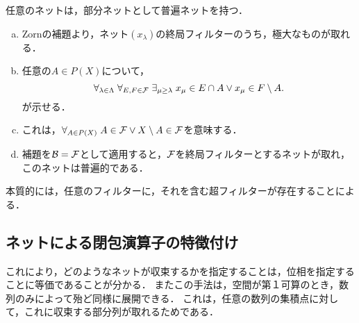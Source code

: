 \documentclass[uplatex,dvipdfmx]{jsreport}
\begin{document}
\begin{theorem}
    任意のネットは，部分ネットとして普遍ネットを持つ．
\end{theorem}
\begin{Proof}\mbox{}
    \begin{enumerate}[(a)]
        \item Zornの補題より，ネット$(x_\lambda)$の終局フィルターのうち，極大なものが取れる．
        \item 任意の$A\in P(X)$について，
        \[\forall_{\lambda\in\Lambda}\;\forall_{E,F\in\mathcal{F}}\;\exists_{\mu\ge\lambda}\;x_\mu\in E\cap A\lor x_\mu\in F\setminus A.\]
        が示せる．
        \item これは，$\forall_{A\in P(X)}\;A\in\mathcal{F}\lor X\setminus A\in\mathcal{F}$を意味する．
        \item 補題を$\mathcal{B}=\mathcal{F}$として適用すると，$\mathcal{F}$を終局フィルターとするネットが取れ，このネットは普遍的である．
    \end{enumerate}
\end{Proof}
\begin{remarks}
    本質的には，任意のフィルターに，それを含む超フィルターが存在することによる．
\end{remarks}

\subsection{ネットによる閉包演算子の特徴付け}

\begin{tcolorbox}[colframe=ForestGreen, colback=ForestGreen!10!white,breakable,colbacktitle=ForestGreen!40!white,coltitle=black,fonttitle=\bfseries\sffamily,
title=]
    これにより，どのようなネットが収束するかを指定することは，位相を指定することに等価であることが分かる．
    またこの手法は，空間が第１可算のとき，数列のみによって殆ど同様に展開できる．
    これは，任意の数列の集積点に対して，これに収束する部分列が取れるためである．
\end{tcolorbox}
\end{document}
